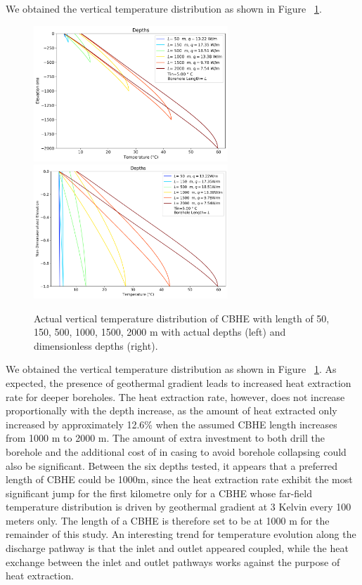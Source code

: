         		We obtained the vertical temperature distribution as shown in Figure ~\ref{fig:Depths}.        \begin{figure}[h!]
            \centering
            \includegraphics[width=0.65\textwidth]{depths_5_TrueDepth.png}
            \includegraphics[width=0.65\textwidth]{depths_5.png}
            \caption{Actual vertical temperature distribution of CBHE with length of 50, 150, 500, 1000, 1500, 2000 m with actual depths (left) and dimensionless depths (right).}
            \label{fig:Depths}
        \end{figure}
		We obtained the vertical temperature distribution as shown in Figure ~\ref{fig:Depths}. As expected, the presence of geothermal gradient leads to increased heat extraction rate for deeper boreholes. The heat extraction rate, however, does not increase proportionally with the depth increase, as the amount of heat extracted only increased by approximately 12.6\% when the assumed CBHE length increases from 1000 m to 2000 m. The amount of extra investment to both drill the borehole and the additional cost of in casing to avoid borehole collapsing could also be significant. Between the six depths tested, it appears that a preferred length of CBHE could be 1000m, since the heat extraction rate exhibit the most significant jump for the first kilometre only for a CBHE whose far-field temperature distribution is driven by geothermal gradient at 3 Kelvin every 100 meters only. The length of a CBHE is therefore set to be at 1000 m for the remainder of this study. An interesting trend for temperature evolution along the discharge pathway is that the inlet and outlet appeared coupled, while the heat exchange between the inlet and outlet pathways works against the purpose of heat extraction.
        
